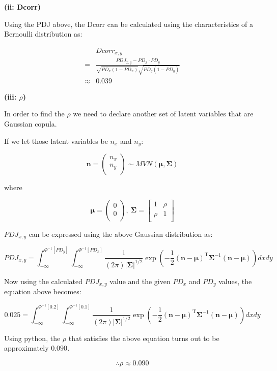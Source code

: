 \documentclass[11pt]{article}
\renewcommand\part[1]{\vspace{.10in}\textbf{(#1)}}
\begin{document}
\part{ii: Dcorr}

Using the PDJ above, the Dcorr can be calculated using the 
characteristics of a Bernoulli distribution as:

$$
\begin{aligned}
&Dcorr_{x, y} \\
=& \frac{PDJ_{x, y} - PD_x \cdot PD_y}
{\sqrt{PD_x (1 - PD_x)}\sqrt{PD_y (1 - PD_y)}} \\
\approx & 0.039
\end{aligned}
$$

\newpage

\part{iii: $\rho$}

In order to find the $\rho$ we need to declare another
set of latent variables that are Gaussian copula.

If we let those latent variables be $n_x$ and $n_y$:

$$
\mathbf{n} = \begin{pmatrix}
n_x \\
n_y \\
\end{pmatrix}
\sim
MVN(\mathbf{\mu}, \mathbf{\Sigma})
$$

where

$$
\mathbf{\mu} = \begin{pmatrix}
0 \\
0 \\
\end{pmatrix}, \
\mathbf{\Sigma} = \begin{bmatrix}
1 & \rho \\
\rho & 1 \\
\end{bmatrix}
$$

$PDJ_{x, y}$ can be expressed using the above 
Gaussian distribution as:

$$
PDJ_{x, y} = \int_{-\infty}^{\Phi^{-1}[PD_y]}
\int_{-\infty}^{\Phi^{-1}[PD_x]}
\frac{1}{(2\pi)|\mathbf{\Sigma}|^{1/2}}
\exp\left(-\frac{1}{2}(\mathbf{n}-\mathbf{\mu})^{\mathrm{T}}
\mathbf{\Sigma}^{-1}(\mathbf{n}-\mathbf{\mu})\right) dx dy
$$

Now using the calculated $PDJ_{x, y}$ value and the given
$PD_x$ and $PD_y$ values, the equation above becomes:

$$
0.025 = \int_{-\infty}^{\Phi^{-1}[0.2]}
\int_{-\infty}^{\Phi^{-1}[0.1]}
\frac{1}{(2\pi)|\mathbf{\Sigma}|^{1/2}}
\exp\left(-\frac{1}{2}(\mathbf{n}-\mathbf{\mu})^{\mathrm{T}}
\mathbf{\Sigma}^{-1}(\mathbf{n}-\mathbf{\mu})\right) dx dy
$$

Using python, the $\rho$ that satisfies the above equation
turns out to be approximately $0.090$.

$$
\therefore
\rho \approx 0.090
$$
\end{document}
